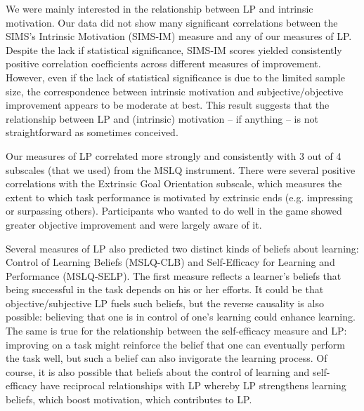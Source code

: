 We were mainly interested in the relationship between \ac{LP} and intrinsic motivation. Our data did not show many significant correlations between the \ac{SIMS}'s Intrinsic Motivation (\ac{SIMS}-IM) measure and any of our measures of \ac{LP}. Despite the lack if statistical significance, \ac{SIMS}-IM scores yielded consistently positive correlation coefficients across different measures of improvement. However, even if the lack of statistical significance is due to the limited sample size, the correspondence between intrinsic motivation and subjective/objective improvement appears to be moderate at best. This result suggests that the relationship between \ac{LP} and (intrinsic) motivation -- if anything -- is not straightforward as sometimes conceived.

Our measures of \ac{LP} correlated more strongly and consistently with 3 out of 4 subscales (that we used) from the \ac{MSLQ} instrument. There were several positive correlations with the Extrinsic Goal Orientation subscale, which measures the extent to which task performance is motivated by extrinsic ends (e.g. impressing or surpassing others). Participants who wanted to do well in the game showed greater objective improvement and were largely aware of it.

Several measures of \ac{LP} also predicted two distinct kinds of beliefs about learning: Control of Learning Beliefs (\ac{MSLQ}-CLB) and Self-Efficacy for Learning and Performance (\ac{MSLQ}-SELP). The first measure reflects a learner's beliefs that being successful in the task depends on his or her efforts. It could be that objective/subjective \ac{LP} fuels such beliefs, but the reverse causality is also possible: believing that one is in control of one's learning could enhance learning. The same is true for the relationship between the self-efficacy measure and \ac{LP}: improving on a task might reinforce the belief that one can eventually perform the task well, but such a belief can also invigorate the learning process. Of course, it is also possible that beliefs about the control of learning and self-efficacy have reciprocal relationships with \ac{LP} whereby \ac{LP} strengthens learning beliefs, which boost motivation, which contributes to \ac{LP}.

